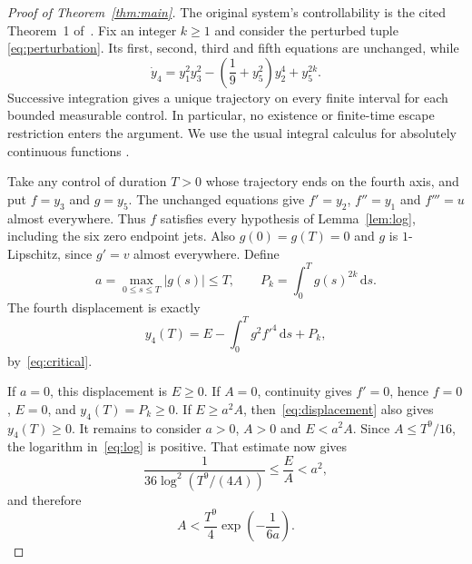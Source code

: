 \documentclass[11pt,a4paper]{article}
\newcommand{\dd}{\,\mathrm{d}}
\begin{document}
\begin{proof}[Proof of Theorem~\ref{thm:main}]
The original system's controllability is the cited Theorem~1 of~\cite{Jin}.
Fix an integer $k\ge1$ and consider the perturbed tuple
\eqref{eq:perturbation}. Its first, second, third and fifth equations are
unchanged, while
\[
 \dot y_4=y_1^2y_3^2-\left(\frac19+y_5^2\right)y_2^4+y_5^{2k}.
\]
Successive integration gives a unique trajectory on every finite interval
for each bounded measurable control. In particular, no existence or
finite-time escape restriction enters the argument.
We use the usual integral calculus for absolutely continuous functions
\cite[Appendix~3.A, Example~3.59 and Theorems~3.60, 3.62]{Hunter}.

Take any control of duration $T>0$ whose trajectory ends on the fourth
axis, and put $f=y_3$ and $g=y_5$.
The unchanged equations give $f'=y_2$, $f''=y_1$ and $f'''=u$ almost
everywhere. Thus $f$ satisfies every hypothesis of Lemma~\ref{lem:log},
including the six zero endpoint jets.
Also $g(0)=g(T)=0$ and $g$ is $1$-Lipschitz, since $g'=v$ almost everywhere.
Define
\[
 a=\max_{0\le s\le T}|g(s)|\le T,\qquad
 P_k=\int_0^T g(s)^{2k}\dd s.
\]
The fourth displacement is exactly
\begin{equation}\label{eq:displacement}
 y_4(T)=E-\int_0^T g^2f'^4\dd s+P_k,
\end{equation}
by~\eqref{eq:critical}.

If $a=0$, this displacement is $E\ge0$.
If $A=0$, continuity gives $f'=0$, hence $f=0$, $E=0$, and
$y_4(T)=P_k\ge0$.
If $E\ge a^2A$, then~\eqref{eq:displacement} also gives $y_4(T)\ge0$.
It remains to consider $a>0$, $A>0$ and $E<a^2A$.
Since $A\le T^9/16$, the logarithm in~\eqref{eq:log} is positive.
That estimate now gives
\[
 \frac{1}{36\log^2(T^9/(4A))}\le\frac EA<a^2,
\]
and therefore
\begin{equation}\label{eq:small-A}
 A<\frac{T^9}{4}\exp\left(-\frac1{6a}\right).
\end{equation}


\end{proof}
\end{document}
